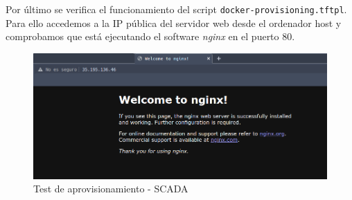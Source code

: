   Por último se verifica el funcionamiento del script \texttt{docker-provisioning.tftpl}. Para ello accedemos a la IP pública del servidor web desde el ordenador host y comprobamos que está ejecutando el software \textit{nginx} en el puerto 80.

  \begin{figure}[h]
  \centering
  \includegraphics[width=\textwidth]{../imgs/desarrollo/resultados/scada/nginx.png}
  \caption{Test de aprovisionamiento - SCADA}
  \end{figure}
